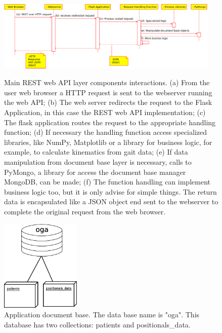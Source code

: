 \documentclass[journal]{IEEEtran}
\begin{document}
\begin{figure}[tb]
	\centering
	{\includegraphics[width=0.95\textwidth]{./rest_web_api_components.eps}}
	\caption{Main REST web API layer components interactions.
		(a) From the user web browser a HTTP request is sent to the  webserver running the web API;
		(b) The web server redirects the request to the Flask Application, in this case the REST 
		web API implementation;
		(c) The flask application routes the request to the appropriate handling function;
		(d) If necessary the handling function access specialized libraries, like NumPy,
		Matplotlib or a library for business logic, for example,
		to calculate kinematics from gait data;
		(e) If data manipulation from document base layer is necessary, calls to PyMongo, a library for
		access the document base manager MongoDB, can be made;
		(f) The function handling can implement business logic too, but it is only advise for simple
		things. The return data is encapsulated like a JSON object end sent to the webserver to
		complete the original request from the web browser.
	}
	\label{rest_web_api_components}
\end{figure}
\begin{figure}[!t]
	\centering
	\includegraphics[width=1.5in]{./mongo_oga.eps}
	\caption{Application document base. The data base name is "oga". 
	This database has two collections: patients and positionals\_data. 
	}
	\label{mongo_oga}
\end{figure}
\end{document}
